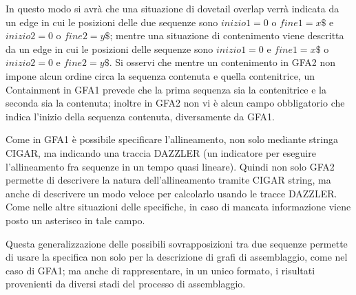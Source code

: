In questo modo si avrà che una situazione di dovetail overlap
verrà indicata da un edge in cui le posizioni delle due sequenze
sono $inizio1=0$ o $fine1 = x\$$ e $inizio2 =0$ o $fine2=y\$$;
mentre una situazione di contenimento viene descritta
da un edge in cui le posizioni delle sequenze sono $inizio1=0$ e 
$fine1=x\$$ o $inizio2=0$ e $fine2=y\$$. Si osservi che mentre
un contenimento in GFA2 non impone alcun ordine circa la sequenza
contenuta e quella contenitrice, un Containment in GFA1 prevede
che la prima sequenza sia la contenitrice e la seconda sia la contenuta;
inoltre in GFA2 non vi è alcun campo obbligatorio che indica l'inizio della
sequenza contenuta, diversamente da GFA1.

Come in GFA1 è possibile specificare l'allineamento, non solo mediante
stringa CIGAR, ma indicando una traccia DAZZLER (un indicatore
per eseguire l'allineamento fra sequenze in un tempo quasi lineare).
Quindi non solo GFA2 permette di descrivere la natura dell'allineamento tramite
CIGAR string, ma anche di descrivere un modo veloce per calcolarlo usando
le tracce DAZZLER. Come nelle altre situazioni delle specifiche, in caso
di mancata informazione viene posto un asterisco in tale campo.

Questa generalizzazione delle possibili sovrapposizioni tra due sequenze
permette di usare la specifica non solo per la descrizione di grafi di assemblaggio,
come nel caso di GFA1; ma anche di rappresentare, in un unico formato,
i risultati provenienti da diversi stadi del processo di assemblaggio.


